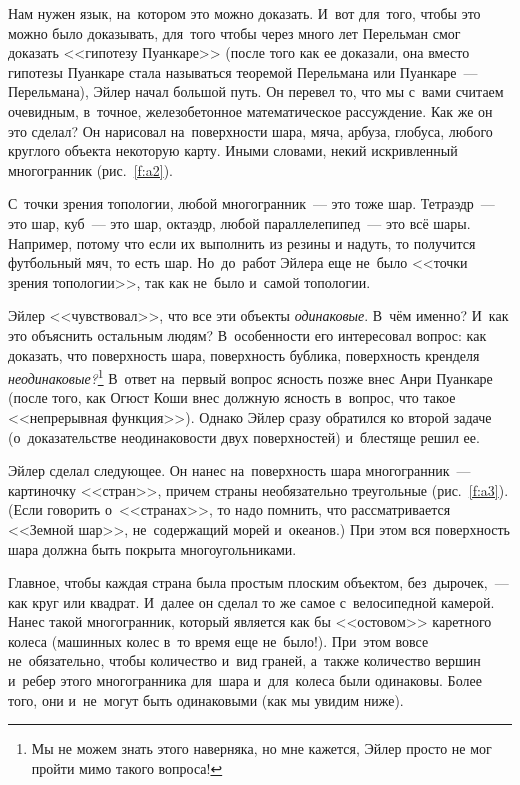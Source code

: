 Нам нужен язык, на~котором это можно доказать. И~вот для~того, чтобы это можно было доказывать,
для~того чтобы через много лет Перельман смог доказать <<гипотезу Пуанкаре>> (после того как ее
доказали, она вместо гипотезы Пуанкаре стала называться теоремой Перельмана или
Пуанкаре~--- Перельмана), Эйлер начал большой путь. Он перевел то, что мы с~вами считаем очевидным,
в~точное, железобетонное математическое рассуждение. Как же он это сделал? Он нарисовал
на~поверхности шара, мяча, арбуза, глобуса, любого круглого объекта некоторую карту. Иными словами,
некий искривленный многогранник (рис.~\ref{f:a2}).


С~точки зрения топологии, любой многогранник~--- это тоже шар. Тетраэдр~--- это шар, куб~--- это
шар, октаэдр, любой параллелепипед~--- это всё шары. Например, потому что если их выполнить из резины и надуть, то получится футбольный мяч, то есть шар.
 Но~до~работ Эйлера еще не~было <<точки зрения
топологии>>, так как не~было и~самой топологии.

Эйлер <<чувствовал>>, что все эти объекты \textit{одинаковые}. В~чём именно? И~как это объяснить остальным
людям? В~особенности его интересовал вопрос: как доказать, что поверхность шара, поверхность
бублика, поверхность кренделя \textit{неодинаковые?}\footnote{Мы не можем знать этого наверняка, но мне кажется, Эйлер просто не мог пройти мимо такого вопроса!}
 В~ответ на~первый вопрос ясность позже внес Анри
Пуанкаре
 (после того, как Огюст Коши внес должную ясность в~вопрос, что такое <<непрерывная
функция>>). Однако Эйлер сразу обратился ко второй задаче (о~доказательстве неодинаковости двух
поверхностей) и~блестяще решил ее.

Эйлер сделал следующее. Он нанес на~поверхность шара многогранник~--- картиночку <<стран>>, причем
страны необязательно треугольные (рис.~\ref{f:a3}). (Если говорить о~<<странах>>, то надо помнить, что рассматривается
<<Земной шар>>, не~содержащий морей и~океанов.) При этом вся поверхность шара должна быть покрыта многоугольниками.



Главное, чтобы каждая страна была простым плоским объектом, без~дырочек,~--- как круг или квадрат.
И~далее он сделал то же самое с~велосипедной камерой. Нанес такой многогранник, который является
как бы <<остовом>> каретного колеса (машинных колес в~то время еще не~было!).
 При~этом вовсе
не~обязательно, чтобы количество и~вид граней, а~также количество вершин и~ребер этого
многогранника для~шара и~для~колеса были одинаковы. Более того, они и~не~могут быть одинаковыми
(как мы увидим ниже).

